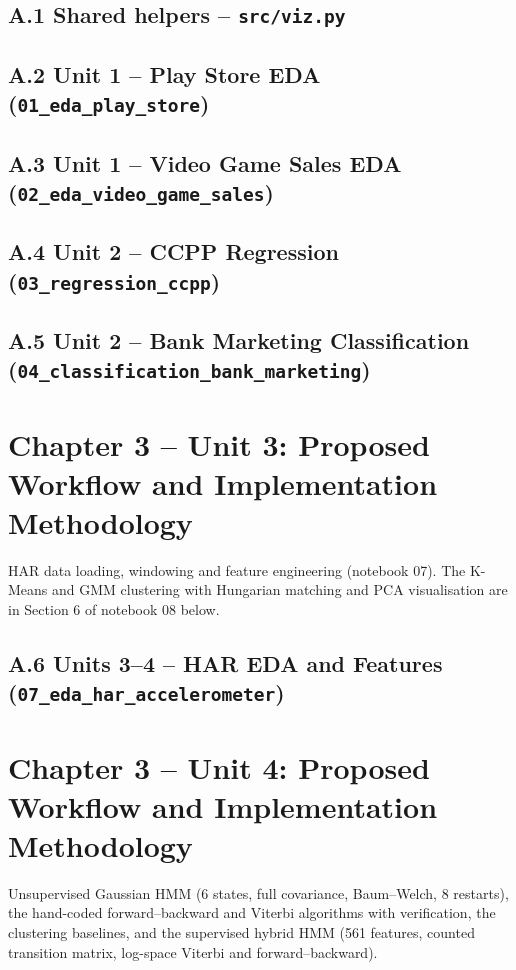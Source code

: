 \subsection*{A.1 Shared helpers – \texttt{src/viz.py}}

\subsection*{A.2 Unit 1 – Play Store EDA (\texttt{01\_eda\_play\_store})}

\subsection*{A.3 Unit 1 – Video Game Sales EDA (\texttt{02\_eda\_video\_game\_sales})}

\subsection*{A.4 Unit 2 – CCPP Regression (\texttt{03\_regression\_ccpp})}

\subsection*{A.5 Unit 2 – Bank Marketing Classification (\texttt{04\_classification\_bank\_marketing})}


\section*{Chapter 3 – Unit 3: Proposed Workflow and Implementation Methodology}
HAR data loading, windowing and feature engineering (notebook 07). The K-Means and GMM clustering with Hungarian
matching and PCA visualisation are in Section 6 of notebook 08 below.
\subsection*{A.6 Units 3–4 – HAR EDA and Features (\texttt{07\_eda\_har\_accelerometer})}


\section*{Chapter 3 – Unit 4: Proposed Workflow and Implementation Methodology}
Unsupervised Gaussian HMM (6 states, full covariance, Baum–Welch, 8 restarts), the hand-coded forward–backward and
Viterbi algorithms with verification, the clustering baselines, and the supervised hybrid HMM (561 features, counted
transition matrix, log-space Viterbi and forward–backward).
